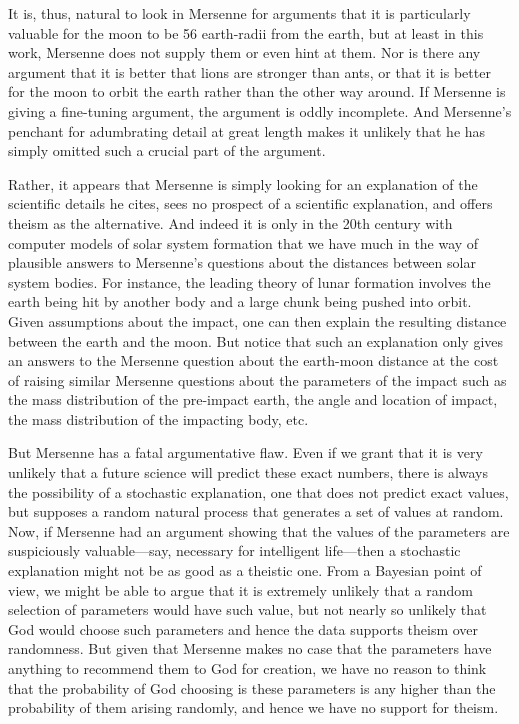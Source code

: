It is, thus, natural to look in Mersenne for arguments that it is particularly valuable for the moon to be 56 earth-radii
from the earth, but at least in this work, Mersenne does not supply them or even hint at them. Nor is there any argument
that it is better that lions are stronger than ants, or that it is better for the moon to orbit the earth rather than
the other way around. If Mersenne is giving a fine-tuning argument, the argument is oddly incomplete. And Mersenne's
penchant for adumbrating detail at great length makes it unlikely that he has simply omitted such a crucial part of the
argument.

Rather, it appears that Mersenne is simply looking for an explanation of the scientific details he cites, sees no
prospect of a scientific explanation, and offers theism as the alternative. And indeed it is only in the 20th century
with computer models of solar system formation that we have much in the way of plausible answers to Mersenne's questions
about the distances between solar system bodies. For instance, the leading theory of lunar formation involves the earth being hit by
another body and a large chunk being pushed into orbit. Given assumptions about the impact, one can then explain the
resulting distance between the earth and the moon. But notice that such an explanation only gives an answers to the 
Mersenne question about the earth-moon distance at the cost of raising similar Mersenne questions about the 
parameters of the impact such as the mass distribution of the pre-impact earth, the angle and location of impact, the 
mass distribution of the impacting body, etc.

But Mersenne has a fatal argumentative flaw. Even if we grant that it is very unlikely that a future science will predict
these exact numbers, there is always the possibility of a stochastic explanation, one that does not predict exact values, 
but supposes a random natural process that generates a set of values at random. Now, if Mersenne had an argument showing
that the values of the parameters are suspiciously valuable---say, necessary for intelligent life---then a stochastic
explanation might not be as good as a theistic one. From a Bayesian point of view, we might be able to argue that it is
extremely unlikely that a random selection of parameters would have such value, but not nearly so unlikely that God would
choose such parameters and hence the data supports theism over randomness. But given that Mersenne makes no case that 
the parameters have anything to recommend them to God for creation, we have no reason to think that the probability of God 
choosing is these parameters is any higher than the probability of them arising randomly, and hence we have no support for
theism.

